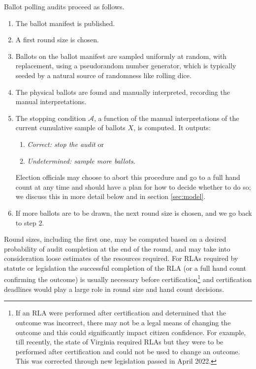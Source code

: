 Ballot polling audits proceed as follows. 
\begin{enumerate}
\item The ballot manifest is published. 
\item A first round size \cite{usenix_minerva} is chosen. %
\item Ballots on the ballot manifest are sampled uniformly at random, with replacement, using a pseudorandom number generator, which is typically seeded by a natural source of randomness like rolling dice.
\item The physical ballots are found and manually interpreted, recording the manual interpretations. 
\item The stopping condition $\mathcal{A}$, a function of the manual interpretations of the current cumulative sample of ballots $X$, is computed. It outputs: 
\begin{enumerate}
\item \emph{Correct: stop the audit} or 
\item \emph{Undetermined: sample more ballots}. 
\end{enumerate}
Election officials may choose to abort this procedure and go to a full hand count at any time and should have a plan for how to decide whether to do so; we discuss this in more detail below and in section \ref{sec:model}.     
\item If more ballots are to be drawn, the next round size is chosen, and we go back to step 2. 
\end{enumerate} 

Round sizes, including the first one, may be computed based on a desired probability of audit completion at the end of the round, and may take into consideration loose estimates of the resources required. For RLAs required by statute or legislation the successful completion of the RLA (or a full hand count confirming the outcome) is usually necessary before certification\footnote{If an RLA were performed after certification and determined that the outcome was incorrect, there may not be a legal means of changing the outcome and this could significantly impact citizen confidence. For example, till recently, the state of Virginia required RLAs but they were to be performed after certification and could not be used to change an outcome. This was corrected through new legislation passed in April 2022.} and certification deadlines would play a large role in round size and hand count decisions. 

